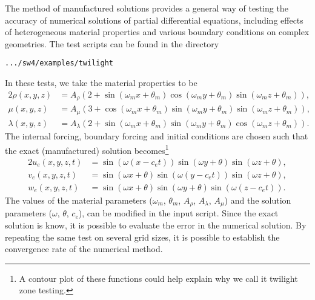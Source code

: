 \documentclass[11pt]{report}
\begin{document}
The method of manufactured solutions provides a general way of testing the accuracy of numerical
solutions of partial differential equations, including effects of heterogeneous material properties
and various boundary conditions on complex geometries. The test scripts can be found in the
directory
\begin{verbatim}
.../sw4/examples/twilight
\end{verbatim}
In these tests, we take the material properties to be
\begin{alignat*}{2}
\rho(x,y,z) &= A_\rho \left( 2 + \sin(\omega_m x + \theta_m) \cos(\omega_m y + \theta_m)
\sin(\omega_m z + \theta_m) \right),\\ 
\mu(x,y,z) &=  A_\mu \left( 3 + \cos(\omega_m x + \theta_m) \sin(\omega_m y + \theta_m)
\sin(\omega_m z + \theta_m) \right),\\ 
\lambda(x,y,z) &=  A_\lambda \left( 2 + \sin(\omega_m x + \theta_m) \sin(\omega_m y + \theta_m)
\cos(\omega_m z + \theta_m) \right).
\end{alignat*}
The internal forcing, boundary forcing and initial conditions are chosen such that the exact
(manufactured) solution becomes\footnote{A contour plot of these functions could help explain why we
  call it twilight zone testing.}
\begin{alignat*}{2}
u_e(x,y,z,t) &= \sin(\omega(x-c_e t)) \sin(\omega y + \theta) \sin(\omega z + \theta), \\
v_e(x,y,z,t) &= \sin(\omega x + \theta) \sin(\omega( y - c_e t)) \sin(\omega z + \theta), \\
w_e(x,y,z,t) &= \sin(\omega x + \theta) \sin(\omega y + \theta) \sin(\omega( z - c_e t)). 
\end{alignat*}
The values of the material parameters ($\omega_m$, $\theta_m$, $A_\rho$, $A_\lambda$, $A_\mu$) and
the solution parameters ($\omega$, $\theta$, $c_e$), can be modified in the input script. Since the
exact solution is know, it is possible to evaluate the error in the numerical solution. By repeating
the same test on several grid sizes, it is possible to establish the convergence rate of the
numerical method.
\end{document}
